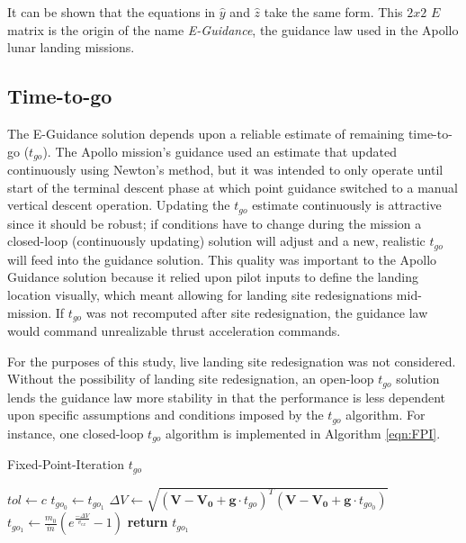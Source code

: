 It can be shown that the equations in $\hat{y}$ and $\hat{z}$ take the same form. This $2x2$ $E$ matrix is the origin of the name \textit{E-Guidance}, the guidance law used in the Apollo lunar landing missions.

\subsection{Time-to-go}
The E-Guidance solution depends upon a reliable estimate of remaining time-to-go ($t_{go}$). The Apollo mission's guidance used an estimate that updated continuously using Newton's method, but it was intended to only operate until start of the terminal descent phase at which point guidance switched to a manual vertical descent operation. Updating the $t_{go}$ estimate continuously is attractive since it should be robust; if conditions have to change during the mission a closed-loop (continuously updating) solution will adjust and a new, realistic $t_{go}$ will feed into the guidance solution. This quality was important to the Apollo Guidance solution because it relied upon pilot inputs to define the landing location visually, which meant allowing for landing site redesignations mid-mission. If $t_{go}$ was not recomputed after site redesignation, the guidance law would command unrealizable thrust acceleration commands.

For the purposes of this study, live landing site redesignation was not considered. Without the possibility of landing site redesignation, an open-loop $t_{go}$ solution lends the guidance law more stability in that the performance is less dependent upon specific assumptions and conditions imposed by the $t_{go}$ algorithm. For instance, one closed-loop $t_{go}$ algorithm is implemented in Algorithm \ref{eqn:FPI}.

\begin{algorithm}
	\caption{Fixed-Point-Iteration $t_{go}$}\label{eqn:FPI}
	\begin{algorithmic}[1]
		\State $tol\gets c$
		\State $t_{go_0} \gets t_{go_1}$
		\State $\Delta V \gets \sqrt{(\boldsymbol{V}-\boldsymbol{V_0} + \boldsymbol{g}\cdot t_{go})^T(\boldsymbol{V}-\boldsymbol{V_0} + \boldsymbol{g}\cdot t_{go_0})}$
		\State $t_{go_1} \gets \frac{m_0}{\dot{m}}\left(e^{\frac{-\Delta V}{v_{ex}}}-1\right)$ 
		\EndWhile
		\State \textbf{return} $t_{go_1}$
		\EndProcedure
	\end{algorithmic}
\end{algorithm}

